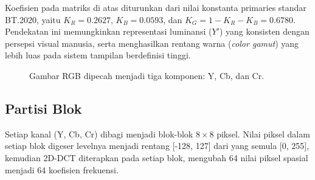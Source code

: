\documentclass[a4paper]{article}
\begin{document}
Koefisien pada matriks di atas diturunkan dari nilai konstanta primaries standar BT.2020, yaitu
$K_R = 0.2627$, $K_B = 0.0593$, dan $K_G = 1 - K_R - K_B = 0.6780$.
Pendekatan ini memungkinkan representasi luminansi ($Y'$) yang konsisten dengan persepsi visual manusia,
serta menghasilkan rentang warna (\textit{color gamut}) yang lebih luas pada sistem tampilan berdefinisi tinggi.
\begin{figure}[h!]
  \centering
  \caption{Gambar RGB dipecah menjadi tiga komponen: Y, Cb, dan Cr.}
  \label{fig:rgb_to_ycbcr}
\end{figure}

\subsection{Partisi Blok}
Setiap kanal (Y, Cb, Cr) dibagi menjadi blok-blok $8 \times 8$ piksel. Nilai piksel dalam setiap blok digeser levelnya menjadi rentang [-128, 127] dari yang semula [0, 255], kemudian 2D-DCT diterapkan pada setiap blok, mengubah 64 nilai piksel spasial menjadi 64 koefisien frekuensi.
\end{document}
